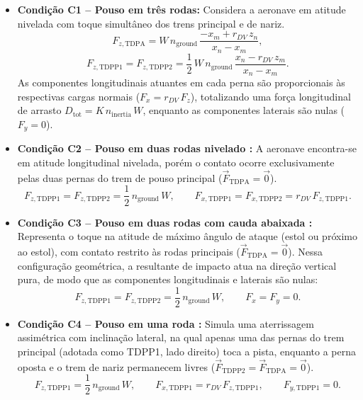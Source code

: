 \begin{itemize}
    \item \textbf{Condição C1 -- Pouso em três rodas:} Considera a aeronave em atitude nivelada com toque simultâneo dos trens principal e de nariz.
    \begin{equation}
        F_{z,\text{TDPA}} = W \, n_{\text{ground}} \, \frac{-x_m + r_{DV} \, z_n}{x_n - x_m},
        \label{eq:c1_nose_z}
    \end{equation}
    \begin{equation}
        F_{z,\text{TDPP1}} = F_{z,\text{TDPP2}} = \frac{1}{2} \, W \, n_{\text{ground}} \, \frac{x_n - r_{DV} \, z_m}{x_n - x_m}.
        \label{eq:c1_main_z}
    \end{equation}
    As componentes longitudinais atuantes em cada perna são proporcionais às respectivas cargas normais ($F_x = r_{DV} \, F_z$), totalizando uma força longitudinal de arrasto $D_{\text{tot}} = K \, n_{\text{inertia}} \, W$, enquanto as componentes laterais são nulas ($F_y = 0$).

    \item \textbf{Condição C2 -- Pouso em duas rodas nivelado :} A aeronave encontra-se em atitude longitudinal nivelada, porém o contato ocorre exclusivamente pelas duas pernas do trem de pouso principal ($\vec{F}_{\text{TDPA}} = \vec{0}$).
    \begin{equation}
        F_{z,\text{TDPP1}} = F_{z,\text{TDPP2}} = \frac{1}{2} \, n_{\text{ground}} \, W, \qquad F_{x,\text{TDPP1}} = F_{x,\text{TDPP2}} = r_{DV} \, F_{z,\text{TDPP1}}.
        \label{eq:c2_loads}
    \end{equation}

    \item \textbf{Condição C3 -- Pouso em duas rodas com cauda abaixada :} Representa o toque na atitude de máximo ângulo de ataque (estol ou próximo ao estol), com contato restrito às rodas principais ($\vec{F}_{\text{TDPA}} = \vec{0}$). Nessa configuração geométrica, a resultante de impacto atua na direção vertical pura, de modo que as componentes longitudinais e laterais são nulas:
    \begin{equation}
        F_{z,\text{TDPP1}} = F_{z,\text{TDPP2}} = \frac{1}{2} \, n_{\text{ground}} \, W, \qquad F_{x} = F_{y} = 0.
        \label{eq:c3_loads}
    \end{equation}

    \item \textbf{Condição C4 -- Pouso em uma roda :} Simula uma aterrissagem assimétrica com inclinação lateral, na qual apenas uma das pernas do trem principal (adotada como TDPP1, lado direito) toca a pista, enquanto a perna oposta e o trem de nariz permanecem livres ($\vec{F}_{\text{TDPP2}} = \vec{F}_{\text{TDPA}} = \vec{0}$).
    \begin{equation}
        F_{z,\text{TDPP1}} = \frac{1}{2} \, n_{\text{ground}} \, W, \qquad F_{x,\text{TDPP1}} = r_{DV} \, F_{z,\text{TDPP1}}, \qquad F_{y,\text{TDPP1}} = 0.
        \label{eq:c4_loads}
    \end{equation}


\end{itemize}
